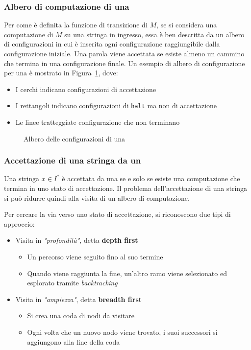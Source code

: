 \documentclass[italian, 10pt]{article}
\begin{document}
\subsubsection{Albero di computazione di una \NTM}

Per come è definita la funzione di transizione di \(M\), se si considera una computazione di \(M\) su una stringa in ingresso, essa è ben descritta da un albero di configurazioni in cui è inserita ogni configurazione raggiungibile dalla configurazione iniziale.
Una parola viene accettata se esiste almeno un cammino che termina in una configurazione finale.
Un esempio di albero di configurazione per una \NTM è mostrato in Figura~\ref{fig:albero-configurazioni-NTM}, dove:

\begin{itemize}
  \item I cerchi indicano configurazioni di accettazione
  \item I rettangoli indicano configurazioni di \texttt{halt} ma non di accettazione
  \item Le linee tratteggiate configurazione che non terminano
\end{itemize}

\begin{figure}[htbp]
  \bigskip
  \centering
  \caption{Albero delle configurazioni di una \NTM}
  \label{fig:albero-configurazioni-NTM}
  \bigskip
\end{figure}

\subsubsection{Accettazione di una stringa da un \NTM}

Una stringa \(x \in I^\ast\) è accettata da una \NTM se e solo se esiste una computazione che termina in uno stato di accettazione.
Il problema dell'accettazione di una stringa si pu\`o ridurre quindi alla visita di un albero di computazione.

Per cercare la via verso uno stato di accettazione, si riconoscono due tipi di approccio:

\begin{itemize}
  \item Visita in \textit{"profondità"}, detta \textbf{depth first}
        \begin{itemize}
          \item Un percorso viene seguito fino al suo termine
          \item Quando viene raggiunta la fine, un'altro ramo viene selezionato ed esplorato tramite \textit{backtracking}
        \end{itemize}
  \item Visita in \textit{"ampiezza"}, detta \textbf{breadth first}
        \begin{itemize}
          \item Si crea una coda di nodi da visitare
          \item Ogni volta che un nuovo nodo viene trovato, i suoi successori si aggiungono alla fine della coda
        \end{itemize}
\end{itemize}
\end{document}
